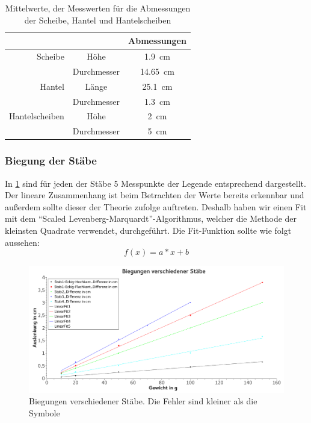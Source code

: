 \documentclass[
	a4paper,
	12pt,
	pagesize,
	ngerman
]{scrartcl}
\begin{document}
	\begin{table}[H]
		\centering
		\begin{tabular}{ r | c | c |} 
			& & Abmessungen\\ \hline
			Scheibe & Höhe & \SI{1,9}{\centi \meter }\\
			& Durchmesser & \SI{14,65}{\centi \meter }\\ \hline
			Hantel & Länge & \SI{25,1}{\centi \meter }\\
			& Durchmesser & \SI{1,3}{\centi \meter }\\ \hline
			Hantelscheiben & Höhe & \SI{2}{\centi \meter } \\
			& Durchmesser & \SI{5}{\centi \meter }\\ \hline
		\end{tabular}
		\caption{Mittelwerte, der Messwerten für die Abmessungen der Scheibe, Hantel und Hantelscheiben}
		\label{Abmessungen_Scheiben}
	\end{table}
	\subsubsection{Biegung der Stäbe}
	In \cref{BiegungGraph} sind für jeden der Stäbe 5 Messpunkte der Legende entsprechend dargestellt. Der lineare Zusammenhang ist beim Betrachten der Werte bereits erkennbar und außerdem sollte dieser der Theorie zufolge auftreten. Deshalb haben wir einen Fit mit dem \enquote{Scaled Levenberg-Marquardt}-Algorithmus, welcher die Methode der kleinsten Quadrate verwendet, durchgeführt. Die Fit-Funktion sollte wie folgt aussehen:
	\begin{equation}
		f(x)=a*x+b
	\end{equation}
	\begin{figure}[H]
		\includegraphics[width=1\textwidth]{Biegungen}
		\centering
		\caption{Biegungen verschiedener Stäbe. Die Fehler sind kleiner als die Symbole}
		\label{BiegungGraph}
		\centering
	\end{figure}
\end{document}
